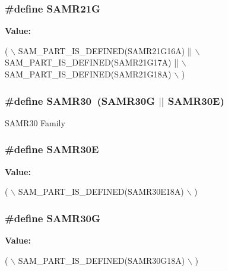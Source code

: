 \subsubsection[{S\+A\+M\+R21\+G}]{\setlength{\rightskip}{0pt plus 5cm}\#define S\+A\+M\+R21\+G}\label{group__sam__part__macros__group_gad414d7dfda114b1381015378bb6a5665}
{\bfseries Value\+:}
\begin{DoxyCode}
( \(\backslash\)
        SAM\_PART\_IS\_DEFINED(SAMR21G16A) || \(\backslash\)
        SAM\_PART\_IS\_DEFINED(SAMR21G17A) || \(\backslash\)
        SAM\_PART\_IS\_DEFINED(SAMR21G18A) \(\backslash\)
    )
\end{DoxyCode}
\hypertarget{group__sam__part__macros__group_gae396c6bd5babec94cd8a290c1ae60a9f}{}
\subsubsection[{S\+A\+M\+R30}]{\setlength{\rightskip}{0pt plus 5cm}\#define S\+A\+M\+R30~(S\+A\+M\+R30\+G $\vert$$\vert$ S\+A\+M\+R30\+E)}\label{group__sam__part__macros__group_gae396c6bd5babec94cd8a290c1ae60a9f}
S\+A\+M\+R30 Family \hypertarget{group__sam__part__macros__group_ga0eee38fa3fab84e5cf0f0f491a401a77}{}
\subsubsection[{S\+A\+M\+R30\+E}]{\setlength{\rightskip}{0pt plus 5cm}\#define S\+A\+M\+R30\+E}\label{group__sam__part__macros__group_ga0eee38fa3fab84e5cf0f0f491a401a77}
{\bfseries Value\+:}
\begin{DoxyCode}
( \(\backslash\)
        SAM\_PART\_IS\_DEFINED(SAMR30E18A) \(\backslash\)
    )
\end{DoxyCode}
\hypertarget{group__sam__part__macros__group_ga94739d4be369821d24f77b4c9ba2ce6e}{}
\subsubsection[{S\+A\+M\+R30\+G}]{\setlength{\rightskip}{0pt plus 5cm}\#define S\+A\+M\+R30\+G}\label{group__sam__part__macros__group_ga94739d4be369821d24f77b4c9ba2ce6e}
{\bfseries Value\+:}
\begin{DoxyCode}
( \(\backslash\)
        SAM\_PART\_IS\_DEFINED(SAMR30G18A) \(\backslash\)
    )
\end{DoxyCode}
\hypertarget{group__sam__part__macros__group_ga8d375463839ea94bd1bdbe23a1f87213}{}
